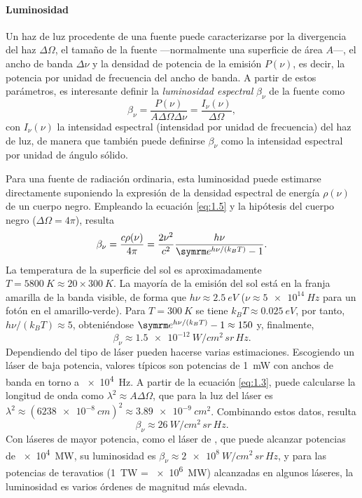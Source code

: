 \paragraph{Luminosidad}\label{par:1.1.2.4}
Un haz de luz procedente de una fuente puede caracterizarse por la divergencia del haz $\Delta\Omega$, el tamaño de la fuente ---normalmente una superficie de área $A$---, el ancho de banda $\Delta\nu$ y la densidad de potencia de la emisión $P(\nu)$, es decir, la potencia por unidad de frecuencia del ancho de banda\autocite{Milonni1988}. A partir de estos parámetros, es interesante definir la \emph{luminosidad espectral} $\beta_{\nu}$ de la fuente como 
\begin{equation}\label{eq:1.5}
    \beta_{\nu} = \frac{P(\nu)}{A\Delta\Omega\Delta\nu} = \frac{I_{\nu}(\nu)}{\Delta\Omega},
\end{equation}
con $I_{\nu}(\nu)$ la intensidad espectral (intensidad por unidad de frecuencia) del haz de luz, de manera que también puede definirse $\beta_{\nu}$ como la intensidad espectral por unidad de ángulo sólido.

Para una fuente de radiación ordinaria, esta luminosidad puede estimarse directamente suponiendo la expresión de la densidad espectral de energía $\rho(\nu)$ de un cuerpo negro. Empleando la ecuación \eqref{eq:1.5} y la hipótesis del cuerpo negro ($\Delta\Omega=4 \pi$), resulta
\begin{equation}\label{eq:1.6}
    \beta_{\nu} = \frac{c \rho(\nu)}{4 \pi} = \frac{2 \nu^{2}}{c^{2}}\frac{h \nu}{\eu^{h \nu/(k_{B}T)}-1}.
\end{equation}
La temperatura de la superficie del sol es aproximadamente $T = \qty{5800}{K} \approx 20 \times \qty{300}{K}$. La mayoría de la emisión del sol está en la franja amarilla de la banda visible, de forma que $h\nu \approx \qty{2,5}{eV}$ ($\nu \approx \qty{5e14}{Hz}$ para un fotón en el amarillo-verde). Para $T = \qty{300}{K}$ se tiene $k_{B}T \approx \qty{0,025}{eV}$, por tanto, $h \nu/(k_{B}T) \approx 5$, obteniéndose $\eu^{h \nu/(k_{B}T)}-1 \approx 150$ y, finalmente,
\begin{equation}\label{eq:1.7}
    \beta_{\nu} \approx \qty{1,5e-12}{W/cm^{2}\,sr\,Hz}.
\end{equation}
Dependiendo del tipo de láser pueden hacerse varias estimaciones. Escogiendo un láser  de baja potencia, valores típicos\autocite{Milonni1988} son potencias de \qty{1}{mW} con anchos de banda en torno a \qty{e4}{Hz}. A partir de la ecuación \eqref{eq:1.3}, puede calcularse la longitud de onda como $\lambda^{2} \approx A\Delta\Omega$, que para la luz del láser  es $\lambda^{2} \approx (\qty{6238e-8}{cm})^{2} \approx \qty{3,89e-9}{cm^{2}}$. Combinando estos datos, resulta 
\begin{equation}\label{eq:1.8}
    \beta_{\nu} \approx \qty{26}{W/cm^{2}\,sr\,Hz}.
\end{equation}
Con láseres de mayor potencia, como el láser de , que puede alcanzar potencias de \qty{e4}{MW}, su luminosidad es $\beta_{\nu} \approx \qty{2e8}{W/cm^{2}\,sr\,Hz}$, y para las potencias de teravatios (\qty{1}{TW} = \qty{e6}{MW}) alcanzadas en algunos láseres, la luminosidad es varios órdenes de magnitud más elevada.

